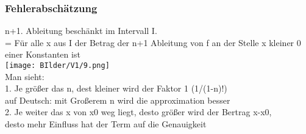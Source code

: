 \documentclass[12pt,a4paper]{article}
\begin{document}
\subsubsection{Fehlerabschätzung}
n+1. Ableitung beschänkt im Intervall I.\\
= Für alle x aus I der Betrag der n+1 Ableitung von f an der Stelle x kleiner 0 einer Konstanten ist\\
\texttt{[image: BIlder/V1/9.png]}\\
Man sieht:\\
1. Je größer das n, dest kleiner wird der Faktor 1 (1/(1-n)!)\\
auf Deutsch: mit Großerem n wird die approximation besser\\
2. Je weiter das x von x0 weg liegt, desto größer wird der Bertrag x-x0, \\
desto mehr Einfluss hat der Term auf die Genauigkeit\\
\end{document}
